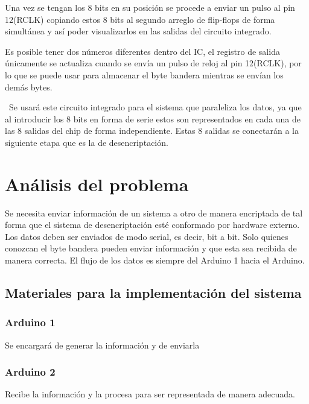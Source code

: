 \documentclass{article}
\begin{document}
Una vez se tengan los 8 bits en su posición se procede a enviar un pulso al pin 12(RCLK) copiando estos 8 bits al segundo arreglo de flip-flops de forma simultánea y así poder visualizarlos en las salidas del circuito integrado\newline. 


Es posible tener dos números diferentes dentro del IC, el registro de salida únicamente se actualiza cuando se envía un pulso de reloj al pin 12(RCLK), por lo que se puede usar para almacenar el byte bandera mientras se envían los demás bytes.\newline


 Se usará este circuito integrado para el sistema que paraleliza los datos, ya que al introducir los 8 bits en forma de serie estos son representados en cada una de las 8 salidas del chip de forma independiente. Estas 8 salidas se conectarán a la siguiente etapa que es la de desencriptación.\newline
 
 \cite{Func_integrado}

\newpage

\section{Análisis del problema}\label{intro}
Se necesita enviar información de un sistema a otro de manera encriptada de tal forma que el sistema de desencriptación esté conformado por hardware externo. Los datos deben ser enviados de modo serial, es decir, bit a bit.
Solo quienes conozcan el byte bandera pueden enviar información y que esta sea recibida de manera correcta.
El flujo de los datos es siempre del Arduino 1 hacia el Arduino.\newline




\subsection{Materiales para la implementación del sistema}

\subsubsection{Arduino 1}
Se encargará de generar la información y de enviarla

\subsubsection{Arduino 2}
Recibe la información y la procesa para ser representada de manera adecuada.
\end{document}
